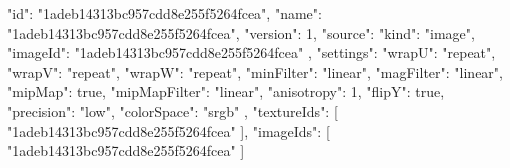 {
  "id": "1adeb14313bc957cdd8e255f5264fcea",
  "name": "1adeb14313bc957cdd8e255f5264fcea",
  "version": 1,
  "source": {
    "kind": "image",
    "imageId": "1adeb14313bc957cdd8e255f5264fcea"
  },
  "settings": {
    "wrapU": "repeat",
    "wrapV": "repeat",
    "wrapW": "repeat",
    "minFilter": "linear",
    "magFilter": "linear",
    "mipMap": true,
    "mipMapFilter": "linear",
    "anisotropy": 1,
    "flipY": true,
    "precision": "low",
    "colorSpace": "srgb"
  },
  "textureIds": [
    "1adeb14313bc957cdd8e255f5264fcea"
  ],
  "imageIds": [
    "1adeb14313bc957cdd8e255f5264fcea"
  ]
}
